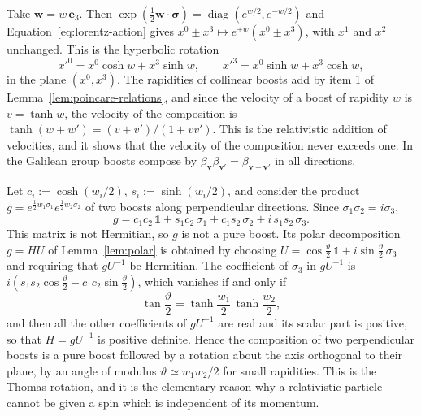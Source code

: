 	\begin{example}\label{ex:collinear-boosts}
		Take $\mathbf{w}=w\,\mathbf{e}_3$. Then $\exp(\tfrac12\mathbf{w}\cdot\boldsymbol{\sigma})=\operatorname{diag}(e^{w/2},e^{-w/2})$ and Equation~\eqref{eq:lorentz-action} gives $x^0\pm x^3\mapsto e^{\pm w}(x^0\pm x^3)$, with $x^1$ and $x^2$ unchanged. This is the hyperbolic rotation
		\begin{equation*}
			x'^0=x^0\cosh w+x^3\sinh w, \qquad x'^3=x^0\sinh w+x^3\cosh w,
		\end{equation*}
		in the plane $(x^0,x^3)$. The rapidities of collinear boosts add by item 1 of Lemma~\ref{lem:poincare-relations}, and since the velocity of a boost of rapidity $w$ is $v=\tanh w$, the velocity of the composition is $\tanh(w+w')=(v+v')/(1+vv')$. This is the relativistic addition of velocities, and it shows that the velocity of the composition never exceeds one. In the Galilean group boosts compose by $\beta_{\mathbf{v}}\beta_{\mathbf{v}'}=\beta_{\mathbf{v}+\mathbf{v}'}$ in all directions.
	\end{example}
	
	\begin{example}\label{ex:thomas-wigner}
		Let $c_i:=\cosh(w_i/2)$, $s_i:=\sinh(w_i/2)$, and consider the product $g=e^{\frac12w_1\sigma_1}e^{\frac12w_2\sigma_2}$ of two boosts along perpendicular directions. Since $\sigma_1\sigma_2=i\sigma_3$,
		\begin{equation*}
			g=c_1c_2\,\mathbb{1}+s_1c_2\,\sigma_1+c_1s_2\,\sigma_2+i\,s_1s_2\,\sigma_3.
		\end{equation*}
		This matrix is not Hermitian, so $g$ is not a pure boost. Its polar decomposition $g=HU$ of Lemma~\ref{lem:polar} is obtained by choosing $U=\cos\tfrac\vartheta2\,\mathbb{1}+i\sin\tfrac\vartheta2\,\sigma_3$ and requiring that $gU^{-1}$ be Hermitian. The coefficient of $\sigma_3$ in $gU^{-1}$ is $i(s_1s_2\cos\tfrac\vartheta2-c_1c_2\sin\tfrac\vartheta2)$, which vanishes if and only if
		\begin{equation*}
			\tan\frac{\vartheta}{2}=\tanh\frac{w_1}{2}\,\tanh\frac{w_2}{2},
		\end{equation*}
		and then all the other coefficients of $gU^{-1}$ are real and its scalar part is positive, so that $H=gU^{-1}$ is positive definite. Hence the composition of two perpendicular boosts is a pure boost followed by a rotation about the axis orthogonal to their plane, by an angle of modulus $\vartheta\simeq w_1w_2/2$ for small rapidities. This is the Thomas rotation, and it is the elementary reason why a relativistic particle cannot be given a spin which is independent of its momentum.
	\end{example}
	
